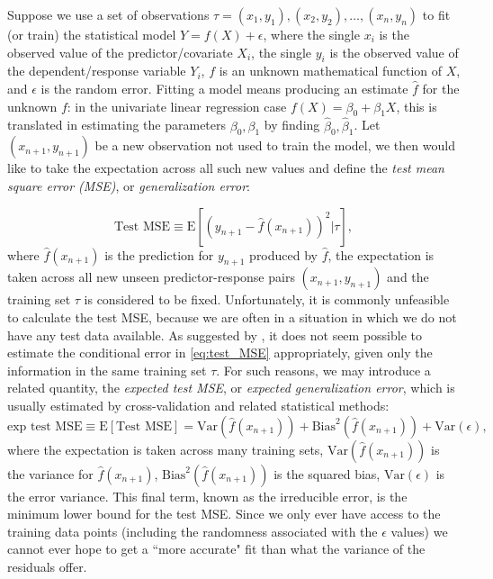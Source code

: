 \documentclass{statsoc}
\begin{document}
Suppose we use a set of observations $\tau=(x_1,y_1),(x_2,y_2),\ldots,(x_n,y_n)$ to fit (or train) the statistical model $Y=f(X)+\epsilon$, where the single $x_i$ is the observed value of the predictor/covariate $X_i$, the single $y_i$ is the observed value of the  dependent/response variable $Y_i$, $f$ is an unknown mathematical function of $X$, and $\epsilon$ is the random error. Fitting a model means producing an estimate $\hat{f}$ for the unknown $f$: in the univariate linear regression case $f(X)= \beta_0+\beta_1X$, this is translated in estimating the parameters $\beta_0,\beta_1$ by finding $\hat{\beta}_0, \hat{\beta}_1$.
Let  $(x_{n+1}, y_{n+1})$ be a new observation not used to train the model, we then would like to take the expectation across all such new values and define the \emph{test mean square error (MSE)}, or \emph{generalization error}:

\begin{equation}
\text{Test MSE} \equiv \textrm{E} \left[ (y_{n+1}-\hat{f}({x}_{n+1}))^2 |\tau \right],
\label{eq:test_MSE}
\end{equation}
%
where $\hat{f}(x_{n+1})$ is the prediction for $y_{n+1}$ produced by $\hat{f}$, the expectation is taken across all new unseen predictor-response pairs $(x_{n+1}, y_{n+1})$ and the training set $\tau$ is considered to be fixed. 
Unfortunately, it is commonly unfeasible to calculate the test MSE, because we are often in a situation in which we do not have any test data available. As suggested by \cite{hastie2009elements}, it does not seem possible to estimate the conditional error in \eqref{eq:test_MSE} appropriately, given only the information in the same training set $\tau$.  For such reasons, we may introduce a related quantity, the \emph{expected test MSE}, or \emph{expected generalization error}, which is usually estimated by cross-validation \citep{hastie2009elements} and related statistical methods:
\begin{equation}
\text{exp test MSE}\equiv \textrm{E}[\text{Test MSE}] = 
 \text{Var}(\hat{f}({x}_{n+1}))+ \text{Bias}^2(\hat{f}({x}_{n+1}))+\text{Var}(\epsilon),
\label{eq:exp_test_MSE}
\end{equation}
%
where the expectation is taken across many training sets, $\text{Var}(\hat{f}(x_{n+1}))$ is the variance for $\hat{f}(x_{n+1})$, $\text{Bias}^2(\hat{f}(x_{n+1}))$ is the squared bias,  $\text{Var}(\epsilon)$ is the error variance.  This final term, known as the irreducible error, is the minimum lower bound for the test MSE. Since we only ever have access to the training data points (including the randomness associated with the  $\epsilon$ values) we cannot ever hope to get a ``more accurate" fit than what the variance of the residuals offer.
\end{document}
